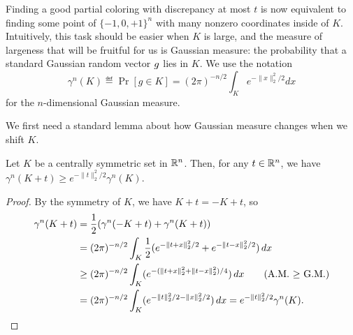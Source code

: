 Finding a good
partial coloring with discrepancy at most \(t\) is now equivalent to
finding some point of \(\{-1, 0, +1\}^n\) with many nonzero
coordinates inside of \(K\). Intuitively, this task should be easier
when \(K\) is large, and the measure of largeness that will be
fruitful for us is Gaussian measure: the probability that a standard
Gaussian random vector \(g\) lies in \(K\). We use the notation
\[
  \gamma^n(K) \eqdef \Pr[g \in K] = %
  {(2\pi)^{-n/2}}\int_K e^{-\|x\|_2^2/2}dx
\]
for the $n$-dimensional Gaussian measure.

We first need a standard lemma about how
Gaussian measure changes when we shift \(K\).

\begin{lemma}\label{lm:ch3-gauss-shift}
  Let \(K\) be a centrally symmetric set in \(\mathbb{R}^n\). Then,
  for any \(t \in \mathbb{R}^n\), we have
  \(
    \gamma^n(K+t) \ge e^{-\|t\|_2^2/2} \gamma^n(K).
  \)
\end{lemma}
\begin{proof}
  By the symmetry of \(K\), we have $K+t = -K+t$, so
  \begin{align}
    \gamma^n(K+t) &= \frac12 (\gamma^n(-K + t) + \gamma^n(K+t))\notag\\
                  &=  %
                  {(2\pi)^{-n/2}}\int_K \frac{1}{2} (e^{-\|t+x\|_2^2/2} +e^{-\|t-x\|_2^2/2})\, dx \notag\\
                  & \geq %
                  {(2\pi)^{-n/2}} \int_K (e^{-(\|t+x\|_2^2 +\|t-x\|_2^2)/4})\, dx
                   \tag{A.M. $\geq$ G.M.} \\
                  & = %
                  {(2\pi)^{-n/2}} \int_K (e^{-\|t\|^2_2/2 -\|x\|_2^2/2}) \, dx =
                    e^{-\|t\|_2^2/2} \gamma^n(K). \notag \ \ \ \ \qedhere
  \end{align}
\end{proof}

